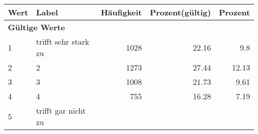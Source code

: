      \begin{longtable}{lXrrr}
     \toprule
     \textbf{Wert} & \textbf{Label} & \textbf{Häufigkeit} & \textbf{Prozent(gültig)} & \textbf{Prozent} \\
     \endhead
     \midrule
     \multicolumn{5}{l}{\textbf{Gültige Werte}}\\

     1 &
     \multicolumn{1}{X}{ trifft sehr stark zu   } &


       \num{1028} &
       \num[round-mode=places,round-precision=2]{22,16} &
         \num[round-mode=places,round-precision=2]{9,8} \\

     2 &
     \multicolumn{1}{X}{ 2   } &


       \num{1273} &
       \num[round-mode=places,round-precision=2]{27,44} &
         \num[round-mode=places,round-precision=2]{12,13} \\

     3 &
     \multicolumn{1}{X}{ 3   } &


       \num{1008} &
       \num[round-mode=places,round-precision=2]{21,73} &
         \num[round-mode=places,round-precision=2]{9,61} \\

     4 &
     \multicolumn{1}{X}{ 4   } &


       \num{755} &
       \num[round-mode=places,round-precision=2]{16,28} &
         \num[round-mode=places,round-precision=2]{7,19} \\

     5 &
     \multicolumn{1}{X}{ trifft gar nicht zu   } &



\end{longtable}
